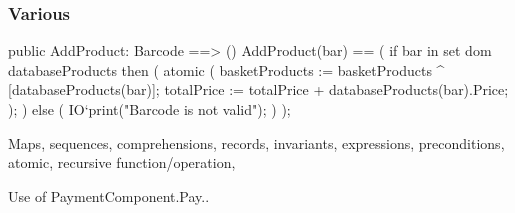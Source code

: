 \subsubsection{Various}
\vspace{-0.5cm}

\begin{vdmpp}
 public AddProduct: Barcode ==> ()
 AddProduct(bar) ==
  (
   if bar in set dom databaseProducts then
   (
    atomic
    (
     basketProducts := basketProducts ^ [databaseProducts(bar)];
     totalPrice := totalPrice + databaseProducts(bar).Price;
    );
   )
   else 
   (
    IO`print("Barcode is not valid\n");
   )
  );
\end{vdmpp}





Maps, sequences, comprehensions, records, invariants, expressions, preconditions, atomic, recursive function/operation, 

Use of PaymentComponent.Pay..